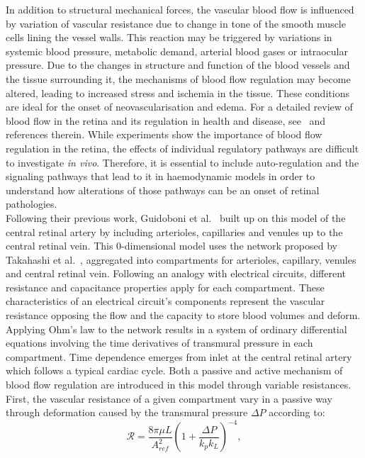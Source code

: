 \documentclass[12pt,a4paper]{journal}
\begin{document}
In addition to structural mechanical forces, the vascular blood flow is influenced by variation of vascular resistance due to change in tone of the smooth muscle cells lining the vessel walls.
This reaction may be triggered by variations in systemic blood pressure, metabolic demand, arterial blood gases or intraocular pressure.
Due to the changes in structure and function of the blood vessels and the tissue surrounding it, the mechanisms of blood flow regulation may become altered, leading to increased stress and ischemia in the tissue.
These conditions are ideal for the onset of neovascularisation and edema.
For a detailed review of blood flow in the retina and its regulation in health and disease, see~\cite{Pournaras_2008} and references therein.
While experiments show the importance of blood flow regulation in the retina, the effects of individual regulatory pathways are difficult to investigate \textit{in vivo}. 
Therefore, it is essential to include auto-regulation and the signaling pathways that lead to it in haemodynamic models in order to understand how alterations of those pathways can be an onset of retinal pathologies.\\
Following their previous work, Guidoboni et al.~\cite{Guidoboni_2014b} built up on this model of the central retinal artery by including arterioles, capillaries and venules up to the central retinal vein.
This 0-dimensional model uses the network proposed by Takahashi et al.~\cite{Takahashi_2009}, aggregated into compartments for arterioles, capillary, venules and central retinal vein.
Following an analogy with electrical circuits, different resistance and capacitance properties apply for each compartment.
These characteristics of an electrical circuit's components represent the vascular resistance opposing the flow and the capacity to store blood volumes and deform.
Applying Ohm's law to the network results in a system of ordinary differential equations involving the time derivatives of transmural pressure in each compartment.
Time dependence emerges from inlet at the central retinal artery which follows a typical cardiac cycle.
Both a passive and active mechanism of blood flow regulation are introduced in this model through variable resistances.
First, the vascular resistance of a given compartment vary in a passive way through deformation caused by the transmural pressure $\Delta P$ according to:
\begin{equation*}
  \label{eq:PassiveVariableResistance}
  \mathcal{R} = \frac{8\pi\mu L}{A^2_{ref}}\left(1+\frac{\Delta P}{k_pk_L}\right)^{-4},
\end{equation*}
\end{document}
